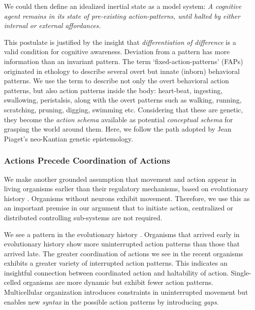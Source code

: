 We could then define an idealized inertial state as a model system:  \textit{A cognitive agent remains in its state of pre-existing action-patterns, until halted by either internal or external affordances.} 

This postulate is justified by the insight that \textit{differentiation of difference} is a valid condition for cognitive awareness.\cite{bateson2000steps} Deviation from a pattern has more information than an invariant pattern. The term `fixed-action-patterns' (FAPs) originated in ethology to describe several overt but innate (inborn) behavioral patterns. We use the term to describe not only the overt behavioral action patterns, but also action patterns inside the body: heart-beat, ingesting, swallowing, peristalsis, along with the overt patterns such as walking, running, scratching, pruning, digging, swimming etc.  Considering that these are genetic, they become the \textit{action schema} available as potential \textit{conceptual schema} for grasping the world around them.  Here, we follow the path adopted by Jean Piaget's neo-Kantian genetic epistemology.\cite{piaget-biology-knowledge}

\subsubsection{Actions Precede Coordination of Actions}

We make another grounded assumption that movement and action appear in living organisms earlier than their regulatory mechanisms, based on evolutionary history \cite{Levin2014}.  Organisms without neurons exhibit movement. Therefore, we use this as an important premise in our argument that to initiate action, centralized or distributed controlling sub-systems are not required.  

We see a pattern in the evolutionary history \cite{Levin2014}.  Organisms that arrived early in evolutionary history show more uninterrupted action patterns than those that arrived late. The greater coordination of actions we see in the recent organisms exhibits a greater variety of interrupted action patterns. This indicates an insightful connection between coordinated action and haltability of action. Single-celled organisms are more dynamic but exhibit fewer action patterns. Multicellular organization introduces constraints in uninterrupted movement but enables new \textit{syntax} in the possible action patterns by introducing \textit{gaps}.  
